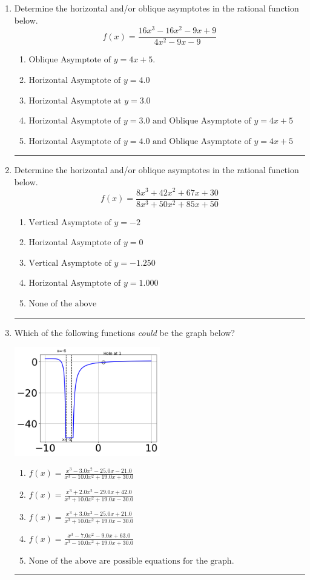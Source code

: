 \documentclass[14pt]{extbook}
\newcommand{\litem}[1]{\item#1\hspace*{-1cm}\rule{\textwidth}{0.4pt}}
\begin{document}
\begin{enumerate}
{\begin{enumerate}[label=\Alph*.]
\end{enumerate} }
\litem{
Determine the horizontal and/or oblique asymptotes in the rational function below.\[ f(x) = \frac{16x^{3} -16 x^{2} -9 x + 9}{4x^{2} -9 x -9} \]\begin{enumerate}[label=\Alph*.]
\item \( \text{Oblique Asymptote of } y = 4x + 5. \)
\item \( \text{Horizontal Asymptote of } y = 4.0  \)
\item \( \text{Horizontal Asymptote at } y = 3.0 \)
\item \( \text{Horizontal Asymptote of } y = 3.0 \text{ and Oblique Asymptote of } y = 4x + 5 \)
\item \( \text{Horizontal Asymptote of } y = 4.0 \text{ and Oblique Asymptote of } y = 4x + 5 \)

\end{enumerate} }
\litem{
Determine the horizontal and/or oblique asymptotes in the rational function below.\[ f(x) = \frac{8x^{3} +42 x^{2} +67 x + 30}{8x^{3} +50 x^{2} +85 x + 50} \]\begin{enumerate}[label=\Alph*.]
\item \( \text{Vertical Asymptote of } y = -2  \)
\item \( \text{Horizontal Asymptote of } y = 0  \)
\item \( \text{Vertical Asymptote of } y = -1.250  \)
\item \( \text{Horizontal Asymptote of } y = 1.000  \)
\item \( \text{None of the above} \)

\end{enumerate} }
\litem{
Which of the following functions \textit{could} be the graph below?
\begin{center}
    \includegraphics[width=0.5\textwidth]{../Figures/identifyGraphOfRationalFunctionB.png}
\end{center}
\begin{enumerate}[label=\Alph*.]
\item \( f(x)=\frac{x^{3} -3.0 x^{2} -25.0 x -21.0}{x^{3} -10.0 x^{2} +19.0 x + 30.0} \)
\item \( f(x)=\frac{x^{3} +2.0 x^{2} -29.0 x + 42.0}{x^{3} +10.0 x^{2} +19.0 x -30.0} \)
\item \( f(x)=\frac{x^{3} +3.0 x^{2} -25.0 x + 21.0}{x^{3} +10.0 x^{2} +19.0 x -30.0} \)
\item \( f(x)=\frac{x^{3} -7.0 x^{2} -9.0 x + 63.0}{x^{3} -10.0 x^{2} +19.0 x + 30.0} \)
\item \( \text{None of the above are possible equations for the graph.} \)


\end{enumerate}}
\end{enumerate}
\end{document}
